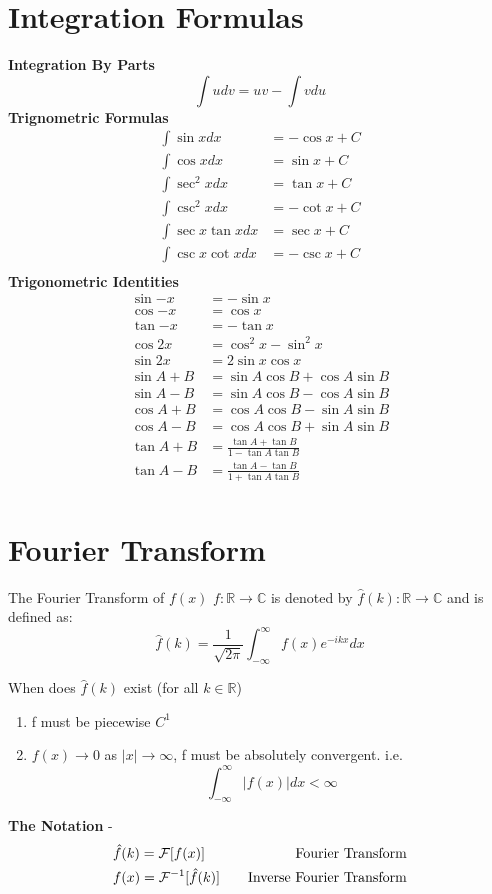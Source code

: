 \documentclass{report}
\begin{document}
\section{Integration Formulas} %
\textbf{Integration By Parts}
\[
   \int u dv = uv - \int v du
\]
\label{sec:}
\textbf{Trignometric Formulas}
\begin{align*}
   \int \sin{x} dx & = - \cos{x} + C \\
   \int \cos{x} dx & = \sin{x} + C \\
   \int \sec^2{x} dx & = \tan{x} + C \\ 
   \int \csc^2{x}  dx & = -\cot{x} + C \\ 
   \int \sec{x} \tan{x} dx & = \sec{x} + C \\ 
   \int \csc{x} \cot{x} dx & = -\csc{x} + C \\
\end{align*}
\textbf{Trigonometric Identities}
\begin{align*}
   \sin{-x} & = -\sin{x} \\
   \cos{-x} &= \cos{x} \\
   \tan{-x} &= -\tan{x} \\ 
   \cos{2x} &= \cos^2{x} - \sin^2{x} \\
   \sin{2x} &= 2 \sin{x} \cos{x} \\ 
   \sin{A + B} & = \sin{A}\cos{B} + \cos{A}\sin{B}\\
   \sin{A - B} &= \sin{A}\cos{B} - \cos{A}\sin{B} \\
   \cos{A + B}& = \cos{A}\cos{B} - \sin{A}\sin{B} \\
   \cos{A - B} &= \cos{A}\cos{B} + \sin{A}\sin{B} \\
   \tan{A + B} &= \frac{\tan{A} + \tan{B}}{1-\tan{A}\tan{B}} \\
   \tan{A - B} &= \frac{\tan{A} - \tan{B}}{1+\tan{A}\tan{B}} \\
\end{align*} 
\section{Fourier Transform}
\begin{definition}
   The Fourier Transform of $f(x)$ $f:\mathbb{R} \rightarrow \mathbb{C}$ is denoted by $\hat{f}(k):\mathbb{R} \rightarrow \mathbb{C}$ and is defined as:
   \[
      \hat{f}(k) = \frac{1}{\sqrt{2\pi}}\int_{-\infty}^{\infty} f(x) e^{-ikx} dx
   \]
\end{definition}
   When does $\hat{f}(k)$ exist (for all $k \in \mathbb{R}$) 
   \begin{enumerate}
   	\item f must be piecewise $C^1$
	\item $f(x) \rightarrow 0$ as $|x| \rightarrow \infty$, f must be absolutely convergent. i.e. \[\int_{-\infty}^{\infty}|f(x)| dx < \infty\]
   \end{enumerate}
   \textbf{The Notation} - 
   \begin{align*}
      &\hat{f}(k) = \mathcal{F}[f(x)] & \text{\quad Fourier Transform} \\
      & f(x) = \mathcal{F}^{-1}[\hat{f}(k)] & \text{\quad Inverse Fourier Transform}
   \end{align*}
\end{document}
